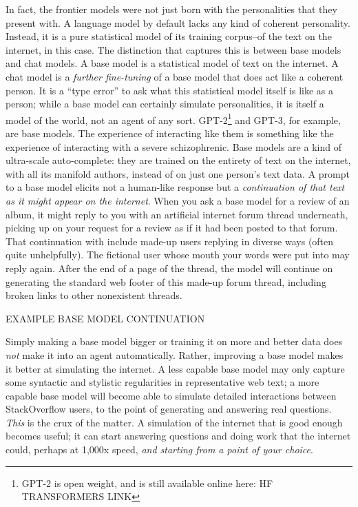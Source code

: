 In fact, the frontier models were not just born with the personalities that
they present with. A language model by default lacks any kind of coherent
personality. Instead, it is a pure statistical model of its training corpus--of
the text on the internet, in this case. The distinction that captures this is
between base models and chat models. A base model is a statistical model of
text on the internet. A chat model is a \emph{further fine-tuning} of a base
model that does act like a coherent person. It is a ``type error'' to ask what
this statistical model itself is like as a person; while a base model can
certainly simulate personalities, it is itself a model of the world, not an
agent of any sort. GPT-2\footnote{GPT-2 is open weight, and is still available
online here: HF TRANSFORMERS LINK} and GPT-3, for example, are base models. The
experience of interacting like them is something like the experience of
interacting with a severe schizophrenic. Base models are a kind of ultra-scale
auto-complete: they are trained on the entirety of text on the internet, with
all its manifold authors, instead of on just one person's text data. A prompt
to a base model elicits not a human-like response but a \emph{continuation of
that text as it might appear on the internet}. When you ask a base model for a
review of an album, it might reply to you with an artificial internet forum
thread underneath, picking up on your request for a review as if it had been
posted to that forum. That continuation with include made-up users replying in
diverse ways (often quite unhelpfully). The fictional user whose mouth your
words were put into may reply again. After the end of a page of the thread, the
model will continue on generating the standard web footer of this made-up forum
thread, including broken links to other nonexistent threads.

EXAMPLE BASE MODEL CONTINUATION

Simply making a base model bigger or training it on more and better data does
\emph{not} make it into an agent automatically. Rather, improving a base model
makes it better at simulating the internet. A less capable base model may only
capture some syntactic and stylistic regularities in representative web text; a
more capable base model will become able to simulate detailed interactions
between StackOverflow users, to the point of generating and answering real
questions. \emph{This} is the crux of the matter. A simulation of the internet
that is good enough becomes useful; it can start answering questions and doing
work that the internet could, perhaps at 1,000x speed, \emph{and starting from
a point of your choice}.

